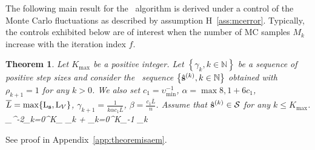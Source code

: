 \documentclass[11pt]{article}
\newtheorem{Theorem}{Theorem}
\theoremstyle{t}
\begin{document}
The following main result for the \ISAEM\ algorithm is derived under a control of the Monte Carlo fluctuations as described by assumption H~\ref{ass:mcerror}.
Typically, the controls exhibited below are of interest when the number of MC samples $M_k$ increase with the iteration index $f$.

\begin{Theorem}\label{thm:isaem}
Let $K_{\max }$ be a positive integer. 
Let $\left\{\gamma_{k}, k \in \mathbb{N}\right\}$ be a sequence of positive step sizes and consider the \ISAEM\ sequence $\left\{\hat{{\mathbf{s}}}^{(k)}, k \in \mathbb{N}\right\}$ obtained with $\rho_{k+1}=1$ for any $k>0$. We also set $c_1 = \upsilon_{\min}^{-1}$, $\alpha = \max{8, 1+6c_1}$, $\overline{L} = \max\{ \operatorname{L}_{{\mathbf{s}}} , \operatorname{L}_{V} \}$, $\gamma_{k+1} = \frac{1}{k \alpha c_1 \overline{L}}$, $\beta = \frac{c_1 \overline{L}}{n}$. 
Assume that $ \hat{{\mathbf{s}}}^{(k)} \in \mathcal{S}$ for any $k \leq K_{\max }$.
\beq
\upsilon_{\max}^{-2}\sum_{k=0}^{K_{\max}} \tilde{\alpha}_k \EE {}  \leq   \EE \left[ V( \hs{0} ) - V( \hs{K} ) \right]+ \sum_{k=0}^{K_{\max}-1} \tilde{\Gamma}_k         \EE {} 
\eeq
\end{Theorem} 
See proof in Appendix~\ref{app:theoremisaem}.
\end{document}
